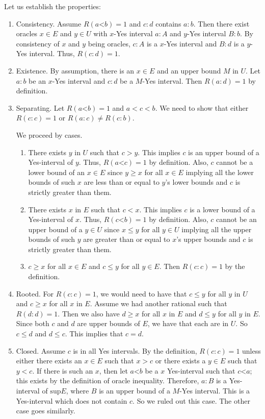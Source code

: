 \documentclass[12pt]{article}
\theoremstyle{remark}
\newcommand{\lt}{\mathord{<}}
\begin{document}
Let us establish the properties: 

\begin{enumerate}
    \item Consistency. Assume $R(a \lt b)=1$ and $c:d$ contains $a:b$. Then there exist oracles $x \in E$ and $y \in U$ with $x$-Yes interval $a:A$ and $y$-Yes interval $B:b$. By consistency of $x$ and $y$ being oracles, $c:A$ is a $x$-Yes interval and $B:d$ is a $y$-Yes interval. Thus, $R(c:d) = 1$.
    \item Existence. By assumption, there is an $x \in E$ and an upper bound $M$ in $U$. Let $a:b$ be an $x$-Yes interval and $c:d$ be a $M$-Yes interval. Then $R(a:d) = 1$ by definition.  
    \item Separating. Let $R(a\lt b)=1$ and $a < c< b$. We need to show that either $R(c:c)=1$ or $R(a:c) \neq R(c:b)$. 

    We proceed by cases.
    \begin{enumerate}
    \item There exists $y$ in $U$ such that $c > y$. This implies $c$ is an upper bound of a Yes-interval of $y$. Thus, $R(a \lt c) = 1$ by definition. Also, $c$ cannot be a lower bound of an $x \in E$ since $y \geq x$ for all $x \in E$ implying all the lower bounds of such $x$ are less than or equal to $y$'s lower bounds and $c$ is strictly greater than them. 

    \item There exists $x$ in $E$ such that $c < x$.  This implies $c$ is a lower bound of a Yes-interval of $x$. Thus, $R(c \lt b) = 1$ by definition. Also, $c$ cannot be an upper bound of a $y \in U$ since $x \leq y$ for all $y \in U$ implying all the upper bounds of such $y$ are greater than or equal to $x$'s upper bounds and $c$ is strictly greater than them. 

    \item $c \geq x$ for all $x \in E$ and $c \leq y$ for all $y \in E$. Then $R(c:c) = 1$ by the definition. 

     \end{enumerate}
    
    \item Rooted. For $R(c:c)=1$, we would need to have that $c \leq y$ for all $y$ in $U$ and $c \geq x$ for all $x$ in $E$. Assume we had another rational such that $R(d:d) = 1$. Then we also have $d \geq x$ for all $x$ in $E$ and $d \leq y$ for all $y$ in $E$. Since both $c$ and $d$ are upper bounds of $E$, we have that each are in $U$. So $c \leq d$ and $d \leq c$. This implies that $c = d$. 
    \item Closed. Assume $c$ is in all Yes intervals. By the definition, $R(c:c) = 1$ unless either there exists an $x \in E$ such that $x> c$ or there exists a $y \in E$ such that $y < c$. If there is such an $x$, then let $a\lt b$ be a $x$ Yes-interval such that $c \lt a$; this exists by the definition of oracle inequality. Therefore, $a:B$ is a Yes-interval of $\mathrm{sup} E$, where $B$ is an upper bound of a $M$-Yes interval. This is a Yes-interval which does not contain $c$. So we ruled out this case. The other case goes similarly.
\end{enumerate}
\end{document}
